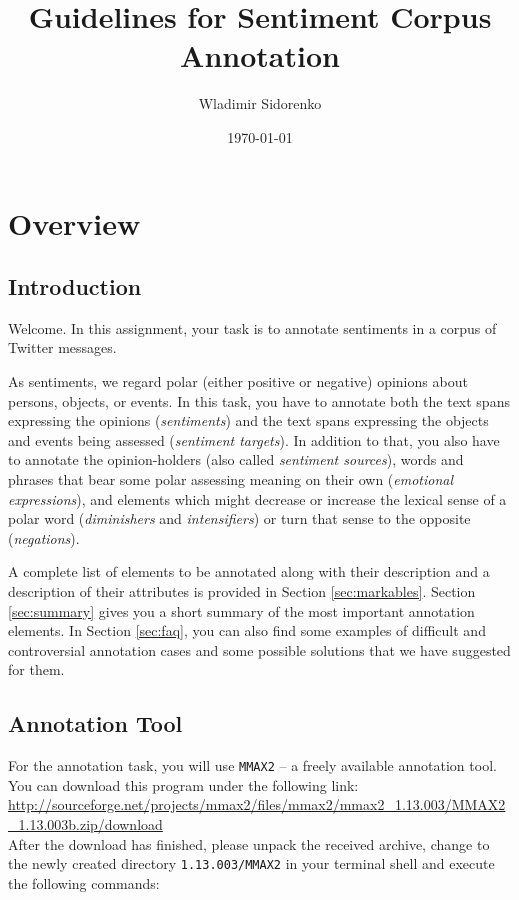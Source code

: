 \documentclass[11pt,a4paper]{article}
\author{Wladimir Sidorenko}
\date{\today}
\title{Guidelines for Sentiment Corpus Annotation}
\begin{document}
\maketitle{}
\section{Overview}
\subsection{Introduction}

Welcome.  In this assignment, your task is to annotate sentiments in a
corpus of Twitter messages.

As sentiments, we regard polar (either positive or negative) opinions
about persons, objects, or events.  In this task, you have to annotate
both the text spans expressing the opinions (\textit{sentiments}) and
the text spans expressing the objects and events being assessed
(\textit{sentiment targets}). In addition to that, you also have to
annotate the opinion-holders (also called \textit{sentiment sources}),
words and phrases that bear some polar assessing meaning on their own
(\textit{emotional expressions}), and elements which might decrease or
increase the lexical sense of a polar word (\textit{diminishers} and
\textit{intensifiers}) or turn that sense to the opposite
(\textit{negations}).

A complete list of elements to be annotated along with their
description and a description of their attributes is provided in
Section \ref{sec:markables}.  Section \ref{sec:summary} gives you a
short summary of the most important annotation elements. In Section
\ref{sec:faq}, you can also find some examples of difficult and
controversial annotation cases and some possible solutions that we
have suggested for them.

\subsection{Annotation Tool}

For the annotation task, you will use \texttt{MMAX2} -- a freely
available annotation tool.  You can download this program under the
following link:\\\newline
{\setlength{\parindent}{0pt}\small\url{http://sourceforge.net/projects/mmax2/files/mmax2/mmax2_1.13.003/MMAX2_1.13.003b.zip/download}}\\\newline
After the download has finished, please unpack the received archive,
change to the newly created directory \texttt{1.13.003/MMAX2} in your
terminal shell and execute the following commands:\\
\end{document}
